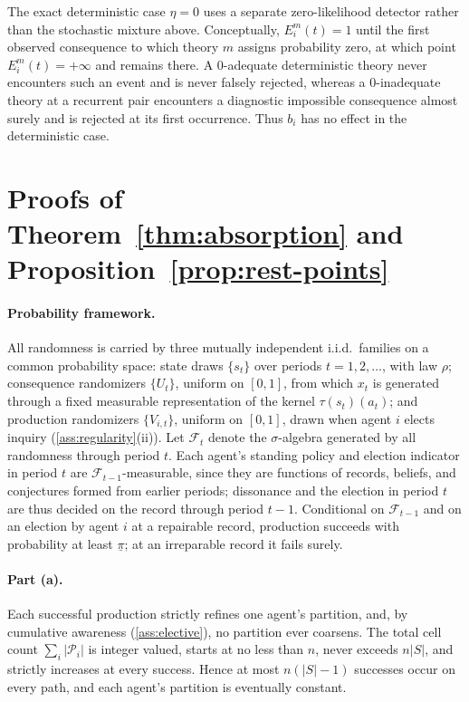 \documentclass[11pt]{article}
\theoremstyle{definition}
\begin{document}
The exact deterministic case $\eta=0$ uses a separate zero-likelihood detector rather than the stochastic mixture above.
Conceptually, $E_i^m(t)=1$ until the first observed consequence to which theory $m$ assigns probability zero, at which point $E_i^m(t)=+\infty$ and remains there.
A $0$-adequate deterministic theory never encounters such an event and is never falsely rejected, whereas a $0$-inadequate theory at a recurrent pair encounters a diagnostic impossible consequence almost surely and is rejected at its first occurrence.
Thus $b_i$ has no effect in the deterministic case.

\section{Proofs of Theorem~\ref{thm:absorption} and
Proposition~\ref{prop:rest-points}}
\label{app:absorption}

\paragraph{Probability framework.}
All randomness is carried by three mutually independent i.i.d.\ families on a common probability space: state draws $\{s_t\}$ over periods $t=1,2,\dots$, with law $\rho$; consequence randomizers $\{U_t\}$, uniform on $[0,1]$, from which $x_t$ is generated through a fixed measurable representation of the kernel $\tau(s_t)(a_t)$; and production randomizers $\{V_{i,t}\}$, uniform on $[0,1]$, drawn when agent $i$ elects inquiry (\cref{ass:regularity}(ii)).
Let $\mathcal F_t$ denote the $\sigma$-algebra generated by all randomness through period $t$.
Each agent's standing policy and election indicator in period $t$ are $\mathcal F_{t-1}$-measurable, since they are functions of records, beliefs, and conjectures formed from earlier periods; dissonance and the election in period $t$ are thus decided on the record through period $t-1$.
Conditional on $\mathcal F_{t-1}$ and on an election by agent $i$ at a repairable record, production succeeds with probability at least $\underline\pi$; at an irreparable record it fails surely.

\paragraph{Part (a).}
Each successful production strictly refines one agent's partition, and, by cumulative awareness (\cref{ass:elective}), no partition ever coarsens.
The total cell count $\sum_i\lvert\mathcal P_i\rvert$ is integer valued, starts at no less than $n$, never exceeds $n\lvert S\rvert$, and strictly increases at every success.
Hence at most $n(\lvert S\rvert-1)$ successes occur on every path, and each agent's partition is eventually constant.
\end{document}
